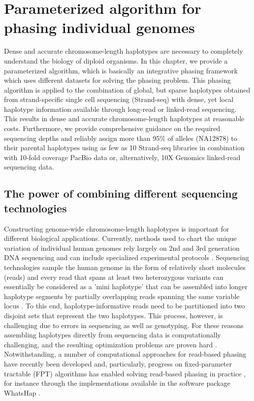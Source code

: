 \chapter{Parameterized algorithm for phasing individual genomes}
Dense and accurate chromosome-length haplotypes are necessary to completely understand the biology of diploid organisms.  
In this chapter, we provide a parameterized algorithm, which is basically an integrative phasing framework which uses different datasets for solving the phasing problem. 
This phasing algorithm is applied to the combination of global, but sparse haplotypes obtained from strand-specific single cell sequencing (Strand-seq) with dense, yet local haplotype information available through long-read or linked-read sequencing.
This results in dense and accurate chromosome-length haplotypes at reasonable costs. 
Furthermore, we provide comprehensive guidance on the required sequencing depths and reliably assign more than 95\% of alleles (NA12878) to their parental haplotypes using as few as 10 Strand-seq libraries in combination with 10-fold coverage PacBio data or, alternatively, 10X Genomics linked-read sequencing data.

\section{The power of combining different sequencing technologies}
Constructing genome-wide chromosome-length haplotypes is important for different biological applications.
Currently, methods used to chart the unique variation of individual human genomes rely largely on 2nd and 3rd generation DNA sequencing and can include specialized experimental protocols \citep{Snyder2015, Porubsky2016, de2014targeted, amini2014haplotype, selvaraj2013whole}. 
Sequencing technologies sample the human genome in the form of relatively short molecules (reads) and every read that spans at least two heterozygous variants 
can essentially be considered as a 'mini haplotype' that can be assembled into longer haplotype segments by partially overlapping reads spanning the same variable locus \citep{Glusman2014}. 
To this end, haplotype-informative reads need to be partitioned into two disjoint sets that represent the two haplotypes. 
This process, however, is challenging due to errors in sequencing as well as genotyping. 
For these reasons assembling haplotypes directly from sequencing data is computationally challenging, and the resulting optimization problems are proven hard \citep{Cilibrasi2007, Lancia2001}. 
Notwithstanding, a number of computational approaches for read-based phasing have recently been developed \citep{rhee2016survey} 
and, particularly, progress on fixed-parameter tractable (FPT) algorithms has enabled solving read-based phasing in practice \citep{deng2013highly, Kuleshov2014, Patterson2015}, for instance through the implementations available in the software package WhatsHap \citep{martin2016whatshap}. 

